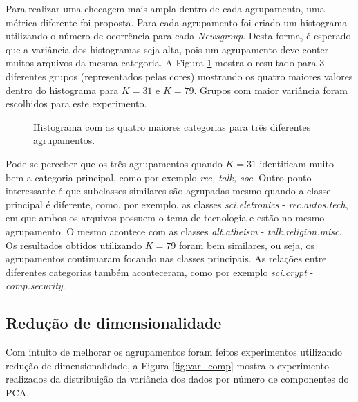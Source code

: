 \documentclass[conference]{IEEEtran}
\begin{document}
Para realizar uma checagem mais ampla dentro de cada agrupamento, uma métrica diferente foi proposta. Para cada agrupamento foi criado um histograma utilizando o número de ocorrência para cada \emph{Newsgroup}. Desta forma, é esperado que a variância dos histogramas seja alta, pois um agrupamento deve conter muitos arquivos da mesma categoria. A Figura \ref{fig:clusters} mostra o resultado para $3$ diferentes grupos (representados pelas cores) mostrando os quatro maiores valores dentro do histograma para $K = 31$ e $K = 79$. Grupos com maior variância foram escolhidos para este experimento.

\begin{figure}[!h]
	\centering
	{
	}
	\caption{\small Histograma com as quatro maiores categorias para três diferentes agrupamentos.}
	\label{fig:clusters}
\end{figure}

Pode-se perceber que os três agrupamentos quando $K = 31$ identificam muito bem a categoria principal, como por exemplo \emph{rec, talk, soc}. Outro ponto interessante é que subclasses similares são agrupadas mesmo quando a classe principal é diferente, como, por exemplo, as classes \emph{sci.eletronics} - \emph{rec.autos.tech}, em que ambos os arquivos possuem o tema de tecnologia e estão no mesmo agrupamento. O mesmo acontece com as classes \emph{alt.atheism} - \emph{talk.religion.misc}. Os resultados obtidos utilizando $K = 79$ foram bem similares, ou seja, os agrupamentos continuaram focando nas classes principais. As relações entre diferentes categorias também aconteceram, como por exemplo \emph{sci.crypt} - \emph{comp.security}.


\subsection{Redução de dimensionalidade}

Com intuito de melhorar os agrupamentos foram feitos experimentos utilizando redução de dimensionalidade, a Figura \ref{fig:var_comp} mostra o experimento realizados da distribuição da variância dos dados por número de componentes do PCA.
\end{document}
